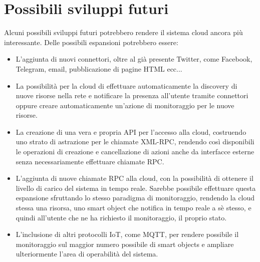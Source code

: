 \section{Possibili sviluppi futuri}
Alcuni possibili sviluppi futuri potrebbero rendere il sistema cloud ancora più interessante. Delle possibili espansioni potrebbero essere:
\begin{itemize}
\item L'aggiunta di nuovi connettori, oltre al già presente Twitter, come Facebook, Telegram, email, pubblicazione di pagine HTML ecc...
\item La possibilità per la cloud di effettuare automaticamente la discovery di nuove risorse nella rete e notificare la presenza all'utente tramite connettori oppure creare automaticamente un'azione di monitoraggio per le nuove risorse.
\item La creazione di una vera e propria API per l'accesso alla cloud, costruendo uno strato di astrazione per le chiamate XML-RPC, rendendo così disponibili le operazioni di creazione e cancellazione di azioni anche da interfacce esterne senza necessariamente effettuare chiamate RPC.
\item L'aggiunta di nuove chiamate RPC alla cloud, con la possibilità di ottenere il livello di carico del sistema in tempo reale. Sarebbe possibile effettuare questa espansione sfruttando lo stesso paradigma di monitoraggio, rendendo la cloud stessa una risorsa, uno smart object che notifica in tempo reale a sè stesso, e quindi all'utente che ne ha richiesto il monitoraggio, il proprio stato.
\item L'inclusione di altri protocolli IoT, come MQTT, per rendere possibile il monitoraggio sul maggior numero possibile di smart objects e ampliare ulteriormente l'area di operabilità del sistema.
\end{itemize}

